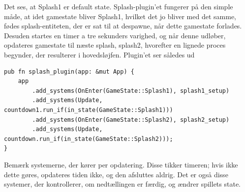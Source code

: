 Det ses, at Splash1 er default state. Splash-plugin'et fungerer på den simple måde, at idet gamestate bliver Splash1, hvilket det jo bliver med det samme, fødes splash-entiteten, der er sat til at despawne, når dette gamestate forlades. Desuden startes en timer a tre sekunders varighed, og når denne udløber, opdateres gamestate til næste splash, splash2, hvorefter en lignede proces begynder, der resulterer i hovedsløjfen. Plugin'et ser således ud

\begin{verbatim}
pub fn splash_plugin(app: &mut App) {
    app
        .add_systems(OnEnter(GameState::Splash1), splash1_setup)
        .add_systems(Update, countdown1.run_if(in_state(GameState::Splash1)))
        .add_systems(OnEnter(GameState::Splash2), splash2_setup)
        .add_systems(Update, countdown.run_if(in_state(GameState::Splash2)));
}
\end{verbatim}

Bemærk systemerne, der kører per opdatering. Disse tikker timeren; hvis ikke dette gøres, opdateres tiden ikke, og den afsluttes aldrig. Det er også disse systemer, der kontrollerer, om nedtællingen er færdig, og ændrer spillets state.

